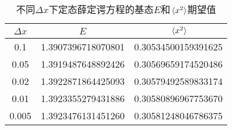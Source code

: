
\begin{table}
    \caption{不同$\Delta x$下定态薛定谔方程的基态$E$和$\expval*{x^2}$期望值}
    \label{tbl:stationary-benchmark}
    \centering
    \begin{tabular}{ccc}
        \toprule
          $\Delta x$ & $E$ & $\expval*{x^2}$ \\
        \midrule
          0.1   & 1.3907396718070801  & 0.30534500159391625  \\
          0.05  & 1.3919487648892426  & 0.30569659174520486  \\
          0.02  & 1.3922871864425093  & 0.30579492589833174  \\
          0.01  & 1.3923355279431886  & 0.30580896967753670 \\ 
          0.005 & 1.3923476131451260  & 0.30581248046786375  \\
        \bottomrule
    \end{tabular}
\end{table}